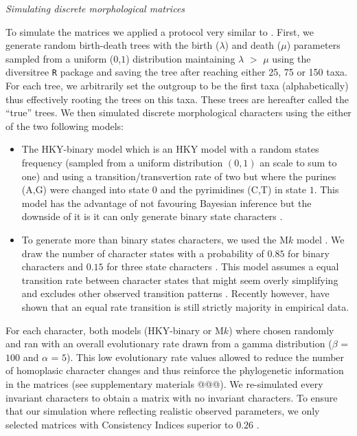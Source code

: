 \documentclass[12pt,letterpaper]{article}
\renewcommand{\subsection}[1]{%
\bigskip
\begin{center}
\begin{large}
\normalfont\itshape #1
\end{large}
\end{center}}
\begin{document}
\subsection{Simulating discrete morphological matrices}
To simulate the matrices we applied a protocol very similar to \citep{Guillerme2016146}.
First, we generate random birth-death trees with the birth ($\lambda$) and death ($\mu$) parameters sampled from a uniform ($0$,$1$) distribution maintaining $\lambda$ $>$ $\mu$ using the diversitree \texttt{R} package \citep[v0.9-8;][]{fitzjohndiversitree2012} and saving the tree after reaching either 25, 75 or 150 taxa.
For each tree, we arbitrarily set the outgroup to be the first taxa (alphabetically) thus effectively rooting the trees on this taxa.
These trees are hereafter called the ``true'' trees.
We then simulated discrete morphological characters using the either of the two following models:
\begin{itemize}
    \item The HKY-binary model \citep{OReilly20160081} which is an HKY model \citep{HKY85} with a random states frequency (sampled from a uniform distribution $(0,1)$ an scale to sum to one) and using a transition/transvertion rate of two \citep{douadycomparison2003} but where the purines (A,G) were changed into state $0$ and the pyrimidines (C,T) in state $1$.
    This model has the advantage of not favouring Bayesian inference \citep[since it doesn't use a M$k$ model;][; see below]{OReilly20160081} but the downside of it is it can only generate binary state characters \citep[or 4 states;][]{puttick2017uncertain}.
    \item To generate more than binary states characters, we used the M$k$ model \citep{lewisa2001}.
    We draw the number of character states with a probability of $0.85$ for binary characters and $0.15$ for three state characters \citep{Guillerme2016146}.
    This model assumes a equal transition rate between character states that might seem overly simplifying and excludes other observed transition patterns \citep[e.g. Dollo characters;][]{Dollo,wright2015came}.
    Recently however, \cite{Wright01072016} have shown that an equal rate transition is still strictly majority in empirical data.
\end{itemize}

\noindent For each character, both models (HKY-binary or M$k$) where chosen randomly and ran with an overall evolutionary rate drawn from a gamma distribution ($\beta$ = $100$ and $\alpha$ = $5$).
This low evolutionary rate values allowed to reduce the number of homoplasic character changes and thus reinforce the phylogenetic information in the matrices (see supplementary materials @@@).
We re-simulated every invariant characters to obtain a matrix with no invariant characters.
To ensure that our simulation where reflecting realistic observed parameters, we only selected matrices with Consistency Indices superior to $0.26$ \citep{OReilly20160081}.
\end{document}
